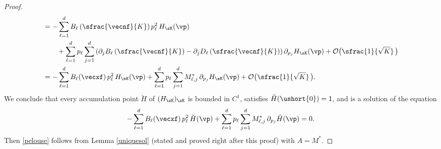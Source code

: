 \begin{proof}
\begin{align*}
& = -\sum_{\ell=1}^{d}B_{\ell}\left(\sfrac{\vecnf}{K}\right) p_{\ell}^2\, H_{\sK}(\vp)\\
& \qquad +\sum_{\ell=1}^{d}p_{\ell}
\sum_{j=1}^{d}\left(\partial_{j}B_{\ell}\left(\sfrac{\vecnf}{K}\right)-\partial_{j}D_{\ell}\left(\sfrac{\vecnf}{K}\right)\right)\partial_{p_{j}}H_{\sK}(\vp)+\mathcal{O}\bigl(\sfrac{1}{\sqrt{K}}\,\bigr)\\
& =-\sum_{\ell=1}^{d}B_{\ell}(\vecxf)\,p_{\ell}^2\,H_{\sK}(\vp)+\sum_{\ell=1}^{d} p_{\ell}\sum_{j=1}^{d}
M_{\ell,j}^*\,\partial_{p_{j}}H_{\sK}(\vp)+\mathcal{O}\bigl(\sfrac{1}{\sqrt{K}}\,\bigr).
\end{align*}
We conclude that every accumulation point $\breve{H}$ of $(H_{\sK})_{\sK}$ is bounded in
$C^{1}$, satisfies $\breve{H}(\ushort{0})=1$, and is a solution of the equation
\[
-\sum_{\ell=1}^{d}B_{\ell}(\vecxf)\,p_{\ell}^2\,\breve{H}(\vp)+\sum_{\ell=1}^{d} p_{\ell}\sum_{j=1}^{d}
M_{\ell,j}^*\,\partial_{p_{j}}\breve{H}(\vp)=0.
\]
Then \eqref{pelouse} follows from Lemma \ref{uniquesol} (stated and proved right after this proof) with $A=M^*$.
\end{proof}

